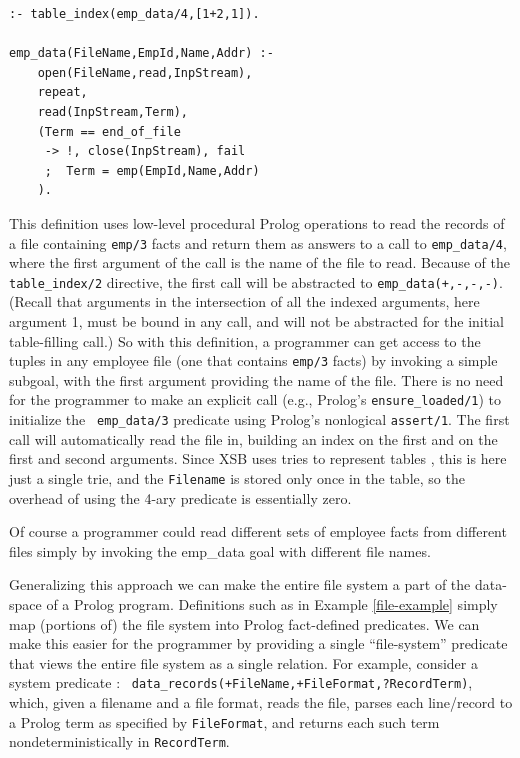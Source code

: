 \begin{example} \label{file-example}
\footnotesize
\begin{verbatim}
:- table_index(emp_data/4,[1+2,1]).

emp_data(FileName,EmpId,Name,Addr) :-
    open(FileName,read,InpStream),
    repeat,
    read(InpStream,Term),
    (Term == end_of_file
     -> !, close(InpStream), fail
     ;  Term = emp(EmpId,Name,Addr)
    ).
\end{verbatim}
\normalsize

\noindent This definition uses low-level procedural Prolog operations
to read the records of a file containing {\tt emp/3} facts and return
them as answers to a call to {\tt emp\_data/4}, where the first
argument of the call is the name of the file to read.  Because of the
{\tt table\_index/2} directive, the first call will be abstracted to
{\tt emp\_data(+,-,-,-)}.  (Recall that arguments in the intersection
of all the indexed arguments, here argument 1, must be bound in any
call, and will not be abstracted for the initial table-filling call.)
So with this definition, a programmer can get access to the tuples in
any employee file (one that contains {\tt emp/3} facts) by invoking a
simple subgoal, with the first argument providing the name of the
file.  There is no need for the programmer to make an explicit call
(e.g., Prolog's {\tt ensure\_loaded/1}) to initialize the {\tt
  emp\_data/3} predicate using Prolog's nonlogical {\tt assert/1}.
The first call will automatically read the file in, building an index
on the first and on the first and second arguments.  Since XSB uses
tries to represent tables \cite{Tries@JLP}, this is here just a single
trie, and the {\tt Filename} is stored only once in the table, so the
overhead of using the 4-ary predicate is essentially zero.

Of course a programmer could read different sets of employee facts
from different files simply by invoking the emp\_data goal with
different file names.
\end{example}

Generalizing this approach we can make the entire file system a part
of the data-space of a Prolog program.  Definitions such as in Example
\ref{file-example} simply map (portions of) the file system into
Prolog fact-defined predicates.  We can make this easier for the
programmer by providing a single ``file-system'' predicate that views
the entire file system as a single relation.  For example, consider a
system predicate \cite{xsbmanual}: {\tt
  data\_records(+FileName,+FileFormat,?RecordTerm)}, which, given a
filename and a file format, reads the file, parses each line/record to
a Prolog term as specified by {\tt FileFormat}, and returns each such
term nondeterministically in {\tt RecordTerm}.

